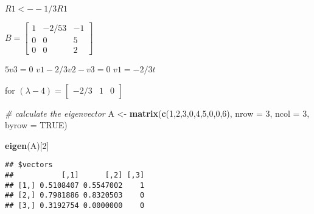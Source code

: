 \documentclass[
]{article}
\newenvironment{Shaded}{\begin{snugshade}}{\end{snugshade}}
\newcommand{\AttributeTok}[1]{\textcolor[rgb]{0.13,0.29,0.53}{#1}}
\newcommand{\CommentTok}[1]{\textcolor[rgb]{0.56,0.35,0.01}{\textit{#1}}}
\newcommand{\ConstantTok}[1]{\textcolor[rgb]{0.56,0.35,0.01}{#1}}
\newcommand{\DecValTok}[1]{\textcolor[rgb]{0.00,0.00,0.81}{#1}}
\newcommand{\FunctionTok}[1]{\textcolor[rgb]{0.13,0.29,0.53}{\textbf{#1}}}
\newcommand{\NormalTok}[1]{#1}
\newcommand{\OtherTok}[1]{\textcolor[rgb]{0.56,0.35,0.01}{#1}}
\begin{document}
\(R1 <- -1/3R1\)

\(B = \begin{bmatrix}1 & -2/53 & -1\\ 0 &0 & 5 \\ 0 & 0 & 2 \end{bmatrix}\)

\(5v3 = 0\) \(v1 - 2/3v2-v3 = 0\) \(v1 = -2/3t\)

for \((\lambda - 4) = \begin{bmatrix}-2/3 & 1 & 0 \end{bmatrix}\)

\begin{Shaded}
\begin{Highlighting}[]
\CommentTok{\# calculate the eigenvector}
\NormalTok{A }\OtherTok{\textless{}{-}} \FunctionTok{matrix}\NormalTok{(}\FunctionTok{c}\NormalTok{(}\DecValTok{1}\NormalTok{,}\DecValTok{2}\NormalTok{,}\DecValTok{3}\NormalTok{,}\DecValTok{0}\NormalTok{,}\DecValTok{4}\NormalTok{,}\DecValTok{5}\NormalTok{,}\DecValTok{0}\NormalTok{,}\DecValTok{0}\NormalTok{,}\DecValTok{6}\NormalTok{), }\AttributeTok{nrow =} \DecValTok{3}\NormalTok{, }\AttributeTok{ncol =} \DecValTok{3}\NormalTok{, }\AttributeTok{byrow =} \ConstantTok{TRUE}\NormalTok{)}

\FunctionTok{eigen}\NormalTok{(A)[}\DecValTok{2}\NormalTok{]}
\end{Highlighting}
\end{Shaded}

\begin{verbatim}
## $vectors
##           [,1]      [,2] [,3]
## [1,] 0.5108407 0.5547002    1
## [2,] 0.7981886 0.8320503    0
## [3,] 0.3192754 0.0000000    0
\end{verbatim}
\end{document}

